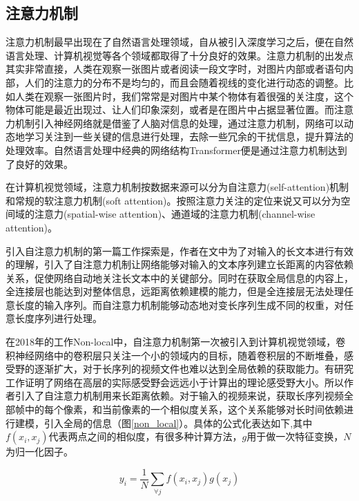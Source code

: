 \documentclass[master]{thesis-uestc}
\begin{document}
\subsection{注意力机制}
注意力机制最早出现在了自然语言处理领域，自从被引入深度学习之后，便在自然语言处理、计算机视觉等各个领域都取得了十分良好的效果。注意力机制的出发点其实非常直接，人类在观察一张图片或者阅读一段文字时，对图片内部或者语句内部，人们的注意力的分布不是均匀的，而且会随着视线的变化进行动态的调整。比如人类在观察一张图片时，我们常常是对图片中某个物体有着很强的关注度，这个物体可能是最近出现过、让人们印象深刻，或者是在图片中占据显著位置。而注意力机制引入神经网络就是借鉴了人脑对信息的处理，通过注意力机制，网络可以动态地学习关注到一些关键的信息进行处理，去除一些冗余的干扰信息，提升算法的处理效率。自然语言处理中经典的网络结构Transformer便是通过注意力机制达到了良好的效果。

在计算机视觉领域，注意力机制按数据来源可以分为自注意力(self-attention)机制和常规的软注意力机制(soft attention)。按照注意力关注的定位来说又可以分为空间域的注意力(spatial-wise attention)、通道域的注意力机制(channel-wise attention)。

引入自注意力机制的第一篇工作探索是，作者在文中为了对输入的长文本进行有效的理解，引入了自注意力机制让网络能够对输入的文本序列建立长距离的内容依赖关系，促使网络自动地关注长文本中的关键部分。同时在获取全局信息的内容上，全连接层也能达到对整体信息，远距离依赖建模的能力，但是全连接层无法处理任意长度的输入序列。而自注意力机制能够动态地对变长序列生成不同的权重，对任意长度序列进行处理。

在2018年的工作Non-local中，自注意力机制第一次被引入到计算机视觉领域，卷积神经网络中的卷积层只关注一个小的领域内的目标，随着卷积层的不断堆叠，感受野的逐渐扩大，对于长序列的视频文件也难以达到全局依赖的获取能力。有研究工作证明了网络在高层的实际感受野会远远小于计算出的理论感受野大小。所以作者引入了自注意力机制用来长距离依赖。对于输入的视频来说，获取长序列视频全部帧中的每个像素，和当前像素的一个相似度关系，这个关系能够对长时间依赖进行建模，引入全局的信息（图\ref{non_local}）。具体的公式化表达如下,其中$f(x_i, x_j)$代表两点之间的相似度，有很多种计算方法，$g$用于做一次特征变换，$N$为归一化因子。

\begin{equation}
    \label{self_attention}
    y_i = \frac{1}{N} \sum_{\forall j} f(x_i, x_j)  g(x_j)
\end{equation}
\end{document}
